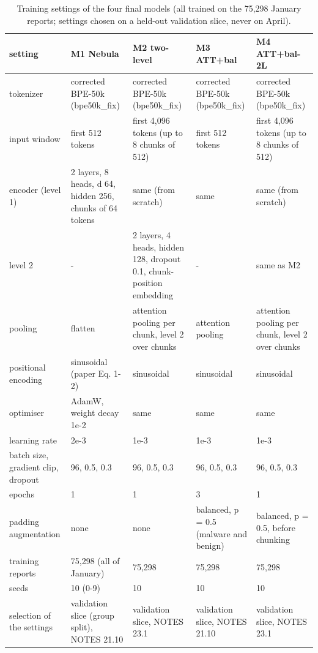 \begin{table}[t]
\centering
\small
\caption{Training settings of the four final models (all trained on the 75,298 January reports; settings chosen on a held-out validation slice, never on April).}
\label{tab:T2_hyperparameters}
\begin{tabular}{lllll}
\toprule
setting & M1 Nebula & M2 two-level & M3 ATT+bal & M4 ATT+bal-2L \\
\midrule
tokenizer & corrected BPE-50k (bpe50k\_fix) & corrected BPE-50k (bpe50k\_fix) & corrected BPE-50k (bpe50k\_fix) & corrected BPE-50k (bpe50k\_fix) \\
input window & first 512 tokens & first 4,096 tokens (up to 8 chunks of 512) & first 512 tokens & first 4,096 tokens (up to 8 chunks of 512) \\
encoder (level 1) & 2 layers, 8 heads, d 64, hidden 256, chunks of 64 tokens & same (from scratch) & same & same (from scratch) \\
level 2 & - & 2 layers, 4 heads, hidden 128, dropout 0.1, chunk-position embedding & - & same as M2 \\
pooling & flatten & attention pooling per chunk, level 2 over chunks & attention pooling & attention pooling per chunk, level 2 over chunks \\
positional encoding & sinusoidal (paper Eq. 1-2) & sinusoidal & sinusoidal & sinusoidal \\
optimiser & AdamW, weight decay 1e-2 & same & same & same \\
learning rate & 2e-3 & 1e-3 & 1e-3 & 1e-3 \\
batch size, gradient clip, dropout & 96, 0.5, 0.3 & 96, 0.5, 0.3 & 96, 0.5, 0.3 & 96, 0.5, 0.3 \\
epochs & 1 & 1 & 3 & 1 \\
padding augmentation & none & none & balanced, p = 0.5 (malware and benign) & balanced, p = 0.5, before chunking \\
training reports & 75,298 (all of January) & 75,298 & 75,298 & 75,298 \\
seeds & 10 (0-9) & 10 & 10 & 10 \\
selection of the settings & validation slice (group split), NOTES 21.10 & validation slice, NOTES 23.1 & validation slice, NOTES 21.10 & validation slice, NOTES 23.1 \\
\bottomrule
\end{tabular}
\end{table}
